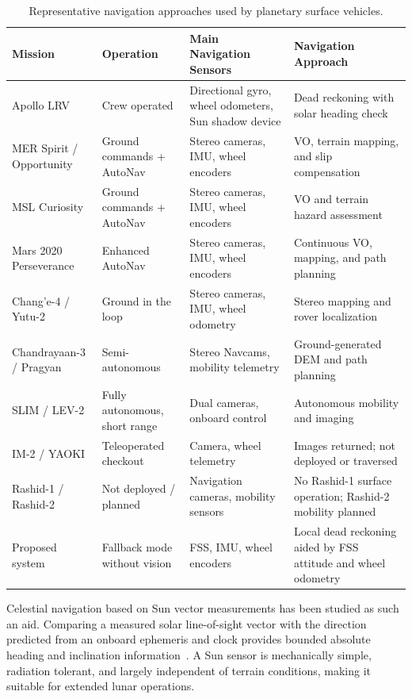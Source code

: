 \documentclass[]{IAC_style}
\begin{document}
\FloatBarrier
\begin{table}[!t]
\centering
\caption{Representative navigation approaches used by planetary surface vehicles.}
\label{tab:rover_navigation}
\scriptsize
\begin{tabularx}{\textwidth}{p{}p{}p{}X}
\toprule
\textbf{Mission} & \textbf{Operation} & \textbf{Main Navigation Sensors} & \textbf{Navigation Approach} \\
\midrule
Apollo LRV~\cite{smith1973lrv} & Crew operated & Directional gyro, wheel odometers, Sun shadow device & Dead reckoning with solar heading check \\
MER Spirit / Opportunity~\cite{maimone2007mer} & Ground commands + AutoNav & Stereo cameras, IMU, wheel encoders & VO, terrain mapping, and slip compensation \\
MSL Curiosity~\cite{rankin2021curiosity} & Ground commands + AutoNav & Stereo cameras, IMU, wheel encoders & VO and terrain hazard assessment \\
Mars 2020 Perseverance~\cite{verma2023perseverance} & Enhanced AutoNav & Stereo cameras, IMU, wheel encoders & Continuous VO, mapping, and path planning \\
Chang'e-4 / Yutu-2~\cite{ma2020yutu2} & Ground in the loop & Stereo cameras, IMU, wheel odometry & Stereo mapping and rover localization \\
Chandrayaan-3 / Pragyan~\cite{isro2024pragyan} & Semi-autonomous & Stereo Navcams, mobility telemetry & Ground-generated DEM and path planning \\
SLIM / LEV-2~\cite{jaxa2024lev2} & Fully autonomous, short range & Dual cameras, onboard control & Autonomous mobility and imaging \\
IM-2 / YAOKI~\cite{dymon2025yaoki} & Teleoperated checkout & Camera, wheel telemetry & Images returned; not deployed or traversed \\
Rashid-1 / Rashid-2~\cite{ispace2023m1,mbrsc2026rashid} & Not deployed / planned & Navigation cameras, mobility sensors & No Rashid-1 surface operation; Rashid-2 mobility planned \\
Proposed system & Fallback mode without vision & FSS, IMU, wheel encoders & Local dead reckoning aided by FSS attitude and wheel odometry \\
\bottomrule
\end{tabularx}
\end{table}

Celestial navigation based on Sun vector measurements has been studied as such an aid. Comparing a measured solar line-of-sight vector with the direction predicted from an onboard ephemeris and clock provides bounded absolute heading and inclination information~\cite{ilyas2016integrated,rhee2007satellite}. A Sun sensor is mechanically simple, radiation tolerant, and largely independent of terrain conditions, making it suitable for extended lunar operations.
\end{document}
